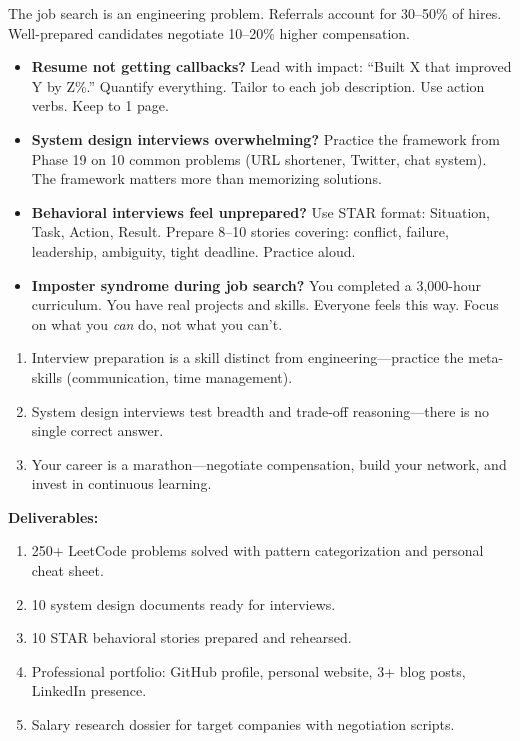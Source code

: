 \documentclass[11pt, a4paper, oneside]{report}
\begin{document}
\begin{realworldbox}
The job search is an engineering problem. Referrals account for 30--50\% of hires. Well-prepared candidates negotiate 10--20\% higher compensation.
\end{realworldbox}


\begin{stuckbox}
\begin{itemize}[leftmargin=*]
\item \textbf{Resume not getting callbacks?} Lead with impact: ``Built X that improved Y by Z\%.'' Quantify everything. Tailor to each job description. Use action verbs. Keep to 1 page.
\item \textbf{System design interviews overwhelming?} Practice the framework from Phase 19 on 10 common problems (URL shortener, Twitter, chat system). The framework matters more than memorizing solutions.
\item \textbf{Behavioral interviews feel unprepared?} Use STAR format: Situation, Task, Action, Result. Prepare 8--10 stories covering: conflict, failure, leadership, ambiguity, tight deadline. Practice aloud.
\item \textbf{Imposter syndrome during job search?} You completed a 3,000-hour curriculum. You have real projects and skills. Everyone feels this way. Focus on what you \emph{can} do, not what you can't.
\end{itemize}
\end{stuckbox}


\begin{takeawaybox}
\begin{enumerate}[leftmargin=*]
\item Interview preparation is a skill distinct from engineering---practice the meta-skills (communication, time management).
\item System design interviews test breadth and trade-off reasoning---there is no single correct answer.
\item Your career is a marathon---negotiate compensation, build your network, and invest in continuous learning.
\end{enumerate}
\end{takeawaybox}

\begin{milestonebox}
\textbf{Deliverables:}
\begin{enumerate}[leftmargin=*]
\item 250+ LeetCode problems solved with pattern categorization and personal cheat sheet.
\item 10 system design documents ready for interviews.
\item 10 STAR behavioral stories prepared and rehearsed.
\item Professional portfolio: GitHub profile, personal website, 3+ blog posts, LinkedIn presence.
\item Salary research dossier for target companies with negotiation scripts.
\end{enumerate}
\end{milestonebox}
\end{document}
